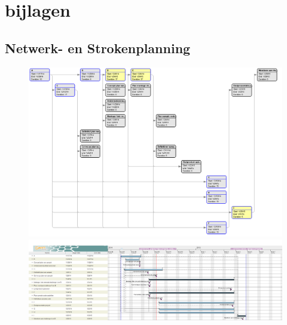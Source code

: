 \documentclass[oneside]{book}
\begin{document}
{\color{red}
\clearpage
\part*{bijlagen}
\chapter*{Netwerk- en Strokenplanning}
\begin{figure}[H]\begin{adjustwidth}{-3cm}{}
\includegraphics[scale=0.35]{image/netwerkplanning.png}
\includegraphics[scale=0.25]{image/strokenplanning.png}
\end{adjustwidth}\end{figure}



}
\end{document}
